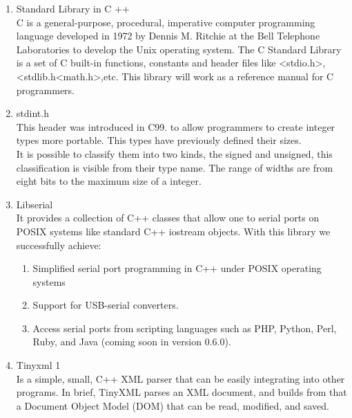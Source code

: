 \documentclass[twocolumn]{IEEEtran}
\begin{document}
	\begin{enumerate}
    
    	\item Standard Library in C ++ \\
        C is a general-purpose, procedural, imperative computer programming 
        language developed in 1972 by Dennis M. Ritchie at the Bell Telephone 
        Laboratories to develop the Unix operating system. The C Standard 
        Library is a set of C built-in functions, constants and header files  
        like <stdio.h>, <stdlib.h<math.h>,etc. This library will work as a
        reference manual for C programmers.\cite{6}\cite{18} \\
    
        \item stdint.h\\
        This header was introduced in C99. to allow programmers to create integer 
        types more portable. This types have previously defined their sizes.\\ It is 
        possible to classify them into two kinds, the signed and unsigned, this 
        classification is visible from their type name. The range of widths are from 
        eight bits to the maximum size of a integer.\cite{8}\\
    
        \item Libserial\\
        It provides a collection of C++ classes that allow one to serial ports on 
        POSIX systems like standard C++ iostream objects. With this library we 
        successfully achieve:
        \begin{enumerate}
        \item Simplified serial port programming in C++ under POSIX operating systems\
        \item Support for USB-serial converters.\
        \item Access serial ports from scripting languages such as 									
        PHP, Python, Perl, Ruby, and Java (coming soon in version 0.6.0).\
		\end{enumerate}
            
         \item Tinyxml 1 \\
         Is a simple, small, C++ XML parser that can be easily integrating into other programs. In 
         brief, TinyXML parses an XML document, and builds from that a Document Object Model (DOM) that 
         can be read, modified, and saved.\cite{16}\\
         

\end{enumerate}
\end{document}
